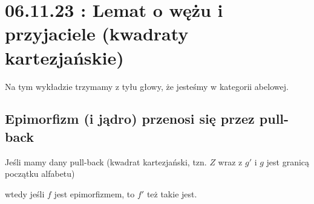 \section{06.11.23 : Lemat o wężu i przyjaciele (kwadraty kartezjańskie)}

Na tym wykładzie trzymamy z tyłu głowy, że jesteśmy w kategorii abelowej.

\subsection{Epimorfizm (i jądro) przenosi się przez pull-back}

\begin{lemma}\label{epi przez pull back}
  Jeśli mamy dany pull-back (kwadrat kartezjański, tzn. $Z$ wraz z $g'$ i $g$ jest granicą początku alfabetu)
  \begin{center}\end{center}
  wtedy jeśli $f$ jest epimorfizmem, to $f'$ też takie jest.
\end{lemma}

